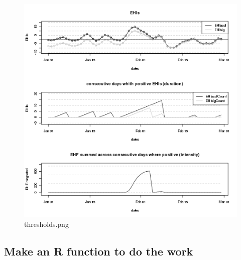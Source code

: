 \documentclass[a4paper]{article}
\begin{document}
\begin{figure}[!h]
\centering
\includegraphics[width=\textwidth]{thresholds.png}
\caption{thresholds.png}
\label{fig:thresholds.png}
\end{figure}
\clearpage

\subsection{Make an R function to do the work}
\end{document}
